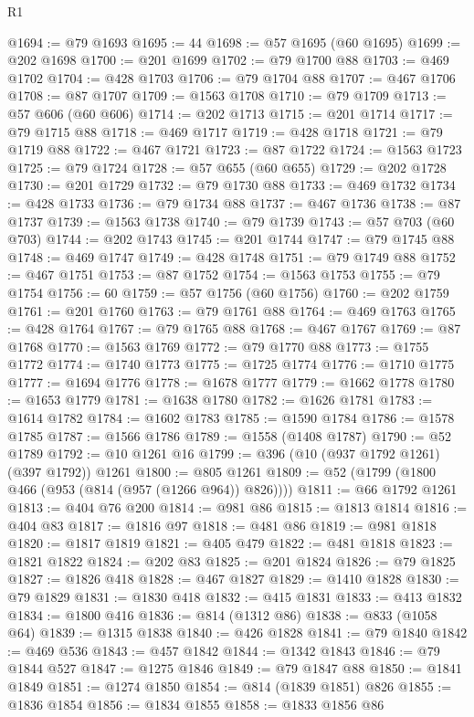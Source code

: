 \begin{lexlean}{R1}
\begin{coremodule}
@1694 := @79 @1693
@1695 := 44
@1698 := @57 @1695 (@60 @1695)
@1699 := @202 @1698
@1700 := @201 @1699
@1702 := @79 @1700 @88
@1703 := @469 @1702
@1704 := @428 @1703
@1706 := @79 @1704 @88
@1707 := @467 @1706
@1708 := @87 @1707
@1709 := @1563 @1708
@1710 := @79 @1709
@1713 := @57 @606 (@60 @606)
@1714 := @202 @1713
@1715 := @201 @1714
@1717 := @79 @1715 @88
@1718 := @469 @1717
@1719 := @428 @1718
@1721 := @79 @1719 @88
@1722 := @467 @1721
@1723 := @87 @1722
@1724 := @1563 @1723
@1725 := @79 @1724
@1728 := @57 @655 (@60 @655)
@1729 := @202 @1728
@1730 := @201 @1729
@1732 := @79 @1730 @88
@1733 := @469 @1732
@1734 := @428 @1733
@1736 := @79 @1734 @88
@1737 := @467 @1736
@1738 := @87 @1737
@1739 := @1563 @1738
@1740 := @79 @1739
@1743 := @57 @703 (@60 @703)
@1744 := @202 @1743
@1745 := @201 @1744
@1747 := @79 @1745 @88
@1748 := @469 @1747
@1749 := @428 @1748
@1751 := @79 @1749 @88
@1752 := @467 @1751
@1753 := @87 @1752
@1754 := @1563 @1753
@1755 := @79 @1754
@1756 := 60
@1759 := @57 @1756 (@60 @1756)
@1760 := @202 @1759
@1761 := @201 @1760
@1763 := @79 @1761 @88
@1764 := @469 @1763
@1765 := @428 @1764
@1767 := @79 @1765 @88
@1768 := @467 @1767
@1769 := @87 @1768
@1770 := @1563 @1769
@1772 := @79 @1770 @88
@1773 := @1755 @1772
@1774 := @1740 @1773
@1775 := @1725 @1774
@1776 := @1710 @1775
@1777 := @1694 @1776
@1778 := @1678 @1777
@1779 := @1662 @1778
@1780 := @1653 @1779
@1781 := @1638 @1780
@1782 := @1626 @1781
@1783 := @1614 @1782
@1784 := @1602 @1783
@1785 := @1590 @1784
@1786 := @1578 @1785
@1787 := @1566 @1786
@1789 := @1558 (@1408 @1787)
@1790 := @52 @1789
@1792 := @10 @1261 @16
@1799 := @396 (@10 (@937 @1792 @1261) (@397 @1792)) @1261
@1800 := @805 @1261
@1809 := @52 (@1799 (@1800 @466 (@953 (@814 (@957 (@1266 @964)) @826))))
@1811 := @66 @1792 @1261
@1813 := @404 @76 @200
@1814 := @981 @86
@1815 := @1813 @1814
@1816 := @404 @83
@1817 := @1816 @97
@1818 := @481 @86
@1819 := @981 @1818
@1820 := @1817 @1819
@1821 := @405 @479
@1822 := @481 @1818
@1823 := @1821 @1822
@1824 := @202 @83
@1825 := @201 @1824
@1826 := @79 @1825
@1827 := @1826 @418
@1828 := @467 @1827
@1829 := @1410 @1828
@1830 := @79 @1829
@1831 := @1830 @418
@1832 := @415 @1831
@1833 := @413 @1832
@1834 := @1800 @416
@1836 := @814 (@1312 @86)
@1838 := @833 (@1058 @64)
@1839 := @1315 @1838
@1840 := @426 @1828
@1841 := @79 @1840
@1842 := @469 @536
@1843 := @457 @1842
@1844 := @1342 @1843
@1846 := @79 @1844 @527
@1847 := @1275 @1846
@1849 := @79 @1847 @88
@1850 := @1841 @1849
@1851 := @1274 @1850
@1854 := @814 (@1839 @1851) @826
@1855 := @1836 @1854
@1856 := @1834 @1855
@1858 := @1833 @1856 @86

\end{coremodule}
\end{lexlean}
